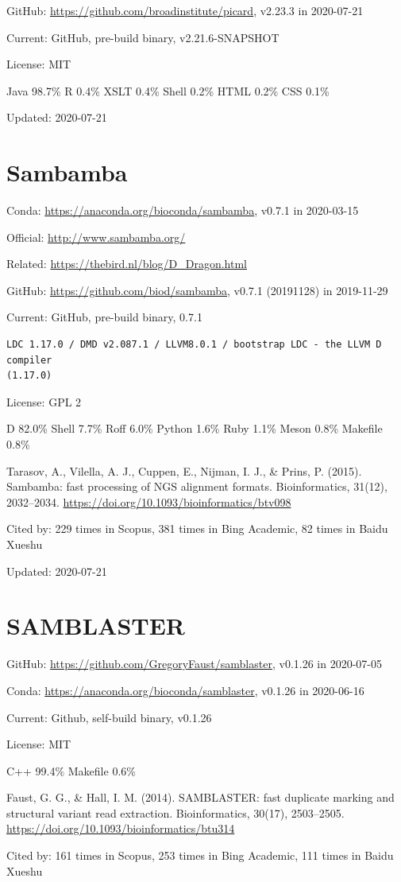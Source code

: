 \documentclass[]{article}
\newcommand{\cb}[3]{\par Cited by: {\color{blue}\Huge #1} times in Scopus, {\color{blue}\Huge #2} times in Bing Academic, {\color{blue}\Huge #3} times in Baidu Xueshu}
\begin{document}
GitHub: \url{https://github.com/broadinstitute/picard}, v2.23.3 in 2020-07-21

Current: GitHub, pre-build binary, v2.21.6-SNAPSHOT

License: MIT

Java 98.7\% R 0.4\% XSLT 0.4\% Shell 0.2\% HTML 0.2\% CSS 0.1\% 

Updated: 2020-07-21

\section{Sambamba}

Conda: \url{https://anaconda.org/bioconda/sambamba}, v0.7.1 in 2020-03-15 

Official: \url{http://www.sambamba.org/}

Related: \url{https://thebird.nl/blog/D_Dragon.html}

GitHub: \url{https://github.com/biod/sambamba}, v0.7.1 (20191128) in 2019-11-29

Current: GitHub, pre-build binary, 0.7.1

\begin{verbatim}
LDC 1.17.0 / DMD v2.087.1 / LLVM8.0.1 / bootstrap LDC - the LLVM D compiler
(1.17.0)
\end{verbatim}

License: GPL 2

D 82.0\% Shell 7.7\% Roff 6.0\% Python 1.6\% Ruby 1.1\% Meson 0.8\% Makefile 0.8\%

Tarasov, A., Vilella, A. J., Cuppen, E., Nijman, I. J., \& Prins, P. (2015). Sambamba: fast processing of NGS alignment formats. Bioinformatics, 31(12), 2032–2034. \url{https://doi.org/10.1093/bioinformatics/btv098}\cb{229}{381}{82}

Updated: 2020-07-21

\section{SAMBLASTER}

GitHub: \url{https://github.com/GregoryFaust/samblaster}, v0.1.26 in 2020-07-05

Conda: \url{https://anaconda.org/bioconda/samblaster}, v0.1.26 in 2020-06-16

Current: Github, self-build binary, v0.1.26

License: MIT

C++ 99.4\% Makefile 0.6\%

Faust, G. G., \& Hall, I. M. (2014). SAMBLASTER: fast duplicate marking and structural variant read extraction. Bioinformatics, 30(17), 2503–2505. \url{https://doi.org/10.1093/bioinformatics/btu314} \cb{161}{253}{111}
\end{document}

